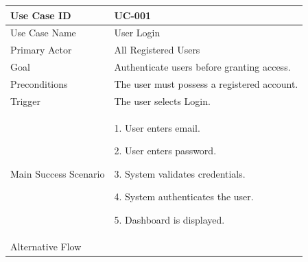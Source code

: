 \begin{longtable}{|p{4cm}|p{10cm}|}

\hline

Use Case ID

&

UC-001

\\

\hline

Use Case Name

&

User Login

\\

\hline

Primary Actor

&

All Registered Users

\\

\hline

Goal

&

Authenticate users before granting access.

\\

\hline

Preconditions

&

The user must possess a registered account.

\\

\hline

Trigger

&

The user selects Login.

\\

\hline

Main Success Scenario

&

1. User enters email.

2. User enters password.

3. System validates credentials.

4. System authenticates the user.

5. Dashboard is displayed.

\\

\hline

Alternative Flow

&


\end{longtable}
